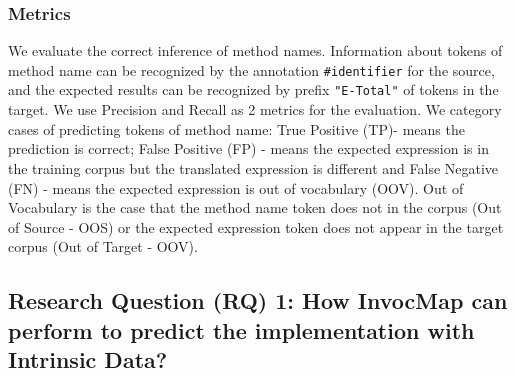 \subsubsection{Metrics}
We evaluate the correct inference of method names. Information about tokens of method name can be recognized by the annotation \texttt{\#identifier} for the source, and the expected results can be recognized by prefix \texttt{"E-Total"} of tokens in the target. We use Precision and Recall as 2 metrics for the evaluation. We category cases of predicting tokens of method name: True Positive (TP)- means the prediction is correct; False Positive (FP) - means the expected expression is in the training corpus but the translated expression is different and False Negative (FN) - means the expected expression is out of vocabulary (OOV). Out of Vocabulary is the case that the method name token does not in the corpus (Out of Source - OOS) or the expected expression token does not appear in the target corpus (Out of Target - OOV). 
 
\subsection{Research Question (RQ) 1: How InvocMap can perform to predict the implementation with Intrinsic Data?}

